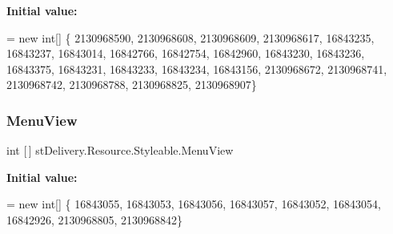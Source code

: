 {\bfseries Initial value\+:}
\begin{DoxyCode}
= \textcolor{keyword}{new} \textcolor{keywordtype}{int}[] \{
                    2130968590,
                    2130968608,
                    2130968609,
                    2130968617,
                    16843235,
                    16843237,
                    16843014,
                    16842766,
                    16842754,
                    16842960,
                    16843230,
                    16843236,
                    16843375,
                    16843231,
                    16843233,
                    16843234,
                    16843156,
                    2130968672,
                    2130968741,
                    2130968742,
                    2130968788,
                    2130968825,
                    2130968907\}
\end{DoxyCode}
\mbox{\label{classst_delivery_1_1_resource_1_1_styleable_a31d55a503f12159b5145be96cac6bb95}} 
\subsubsection{\texorpdfstring{Menu\+View}{MenuView}}
{\footnotesize\ttfamily int \mbox{[}$\,$\mbox{]} st\+Delivery.\+Resource.\+Styleable.\+Menu\+View\hspace{0.3cm}{\ttfamily [static]}}

{\bfseries Initial value\+:}
\begin{DoxyCode}
= \textcolor{keyword}{new} \textcolor{keywordtype}{int}[] \{
                    16843055,
                    16843053,
                    16843056,
                    16843057,
                    16843052,
                    16843054,
                    16842926,
                    2130968805,
                    2130968842\}
\end{DoxyCode}
\mbox{\label{classst_delivery_1_1_resource_1_1_styleable_a92e4f477a2c4f216ba13c28398221e96}} 
